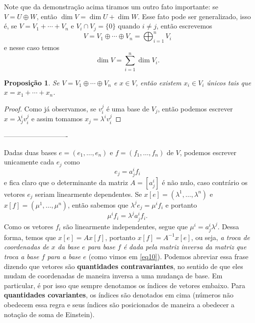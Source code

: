 \documentclass{article}
\newtheorem{proposition}[definition]{Proposição}
\begin{document}
Note que da demonstração acima tiramos um outro fato importante: se $V = U \oplus W$, então $\dim V = \dim U + \dim W$. Esse fato pode ser generalizado, isso é, se $V = V_1 + \cdots + V_n$ e $V_i \cap V_j = \{0\}$ quando $i \neq j$, então escrevemos \begin{equation}
    V = V_1 \oplus \cdots \oplus V_n = \bigoplus_{i = 1}^n V_i
\end{equation} e nesse caso temos \begin{equation}
    \dim V = \sum_{i = 1}^n \dim V_i.
\end{equation}

\begin{proposition}
    Se $V = V_1 \oplus \cdots \oplus V_n$ e $x \in V$, então existem $x_i \in V_i$ únicos tais que $x = x_1 + \cdots + x_n$.
\end{proposition}
\begin{proof}
    Como já observamos, se $v_i^j$ é uma base de $V_j$, então podemos escrever $x = \lambda_j^i v_i^j$ e assim tomamos $x_j = \lambda^i v_i^j$
\end{proof}

----------------------------

Dadas duas bases $e = (e_1, \dots, e_n)$ e $f = (f_1, \dots, f_n)$ de $V$, podemos escrever unicamente cada $e_j$ como \begin{equation}\label{eq10}
    e_j = a^i_j f_i
\end{equation} e fica claro que o determinante da matriz $A = [a^i_j]$ é não nulo, caso contrário os vetores $e_j$ seriam linearmente dependentes. Se $x[e] = (\lambda^1, \dots, \lambda^n)$ e $x[f] = (\mu^1, \dots, \mu^n)$, então sabemos que $\lambda^j e_j = \mu^i f_i$ e portanto \begin{equation}
    \mu^i f_i = \lambda^j a^i_j f_i.
\end{equation} Como os vetores $f_i$ são linearmente independentes, segue que $\mu^i = a^i_j \lambda^j$. Dessa forma, temos que $x[e] = A x[f]$, portanto $x[f] = A^{-1} x[e]$, ou seja, \textit{a troca de coordenadas de $x$ da base $e$ para base $f$ é dada pela matriz inversa da matriz que troca a base $f$ para a base $e$} (como vimos em \ref{eq10}). Podemos abreviar essa frase dizendo que vetores são \textbf{quantidades contravariantes}, no sentido de que eles mudam de coordenadas de maneira inversa a uma mudança de base. Em particular, é por isso que sempre denotamos os índices de vetores embaixo. Para \textbf{quantidades covariantes}, os índices são denotados em cima (números não obedecem essa regra e seus índices são posicionados de maneira a obedecer a notação de soma de Einstein).
\end{document}
